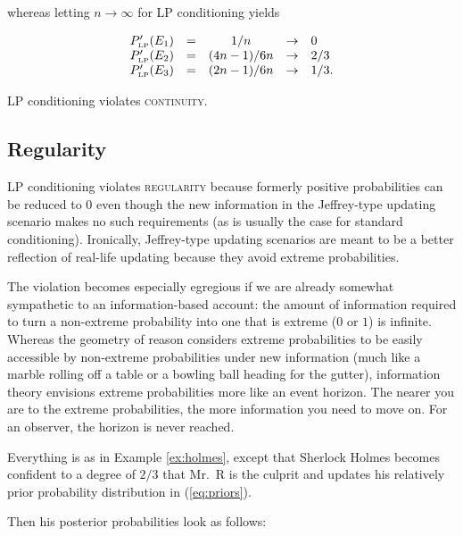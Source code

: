 \documentclass[11pt]{article}
\begin{document}
whereas letting $n\rightarrow\infty$ for LP conditioning yields

\begin{equation}
  \label{eq:sherlockcontlp}
  \begin{array}{rcccl}
  P'_{\mbox{\tiny LP}}(E_{1})&=&1/n&\rightarrow&0\\
  P'_{\mbox{\tiny LP}}(E_{2})&=&(4n-1)/6n&\rightarrow&2/3\\
  P'_{\mbox{\tiny LP}}(E_{3})&=&(2n-1)/6n&\rightarrow&1/3.
\end{array}
\end{equation}

LP conditioning violates \textsc{continuity}.

\subsection{Regularity}
\label{Regularity}

LP conditioning violates \textsc{regularity} because formerly positive
probabilities can be reduced to $0$ even though the new information in
the Jeffrey-type updating scenario makes no such requirements (as is
usually the case for standard conditioning). Ironically, Jeffrey-type
updating scenarios are meant to be a better reflection of real-life
updating because they avoid extreme probabilities. 

The violation becomes especially egregious if we are already somewhat
sympathetic to an information-based account: the amount of information
required to turn a non-extreme probability into one that is extreme
($0$ or $1$) is infinite. Whereas the geometry of reason considers
extreme probabilities to be easily accessible by non-extreme
probabilities under new information (much like a marble rolling off a
table or a bowling ball heading for the gutter), information theory
envisions extreme probabilities more like an event horizon. The nearer
you are to the extreme probabilities, the more information you need to
move on. For an observer, the horizon is never reached.

\begin{quotex}
  \label{ex:regularity} Everything is as
  in Example \ref{ex:holmes}, except that Sherlock Holmes becomes
  confident to a degree of $2/3$ that Mr.\ R is the culprit and
  updates his relatively prior probability distribution in
  (\ref{eq:priors}).
\end{quotex}

Then his posterior probabilities look as follows:
\end{document}
